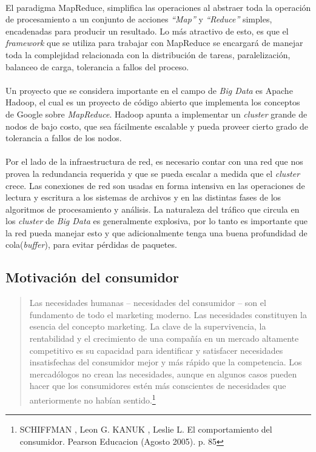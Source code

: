 \paragraph{}
El paradigma MapReduce, simplifica las operaciones al abstraer toda la operaci\'on de procesamiento a un conjunto de acciones \textit{“Map”} y \textit{“Reduce”} simples, encadenadas para producir un resultado. Lo m\'as atractivo de esto, es que el \textit{framework} que se utiliza para trabajar con MapReduce se encargar\'a de manejar toda la complejidad relacionada con la distribuci\'on de tareas, paralelizaci\'on, balanceo de carga, tolerancia a fallos del proceso.
\paragraph{}
Un proyecto que se considera importante en el campo de \textit{Big Data} es Apache Hadoop, el cual es un proyecto de c\'odigo abierto que implementa los conceptos de Google sobre \textit{MapReduce}. Hadoop apunta a implementar un \textit{cluster} grande de nodos de bajo costo, que sea f\'acilmente escalable y pueda proveer cierto grado de tolerancia a fallos de los nodos.
\paragraph{}
Por el lado de la infraestructura de red, es necesario contar con una red que nos provea la redundancia requerida y que se pueda escalar a medida que el \textit{cluster} crece. Las conexiones de red son usadas en forma intensiva en las operaciones de lectura y escritura a los sistemas de archivos y en las distintas fases de los algoritmos de procesamiento y an\'alisis. La naturaleza del tr\'afico que circula en los \textit{cluster} de \textit{Big Data} es generalmente explosiva, por lo tanto es importante que la red pueda manejar esto y que adicionalmente tenga una buena profundidad de cola(\textit{buffer}), para evitar p\'erdidas de paquetes.
\subsection{Motivaci\'on del consumidor}
\begin{quote}
Las necesidades humanas – necesidades del consumidor – son el fundamento de todo el marketing moderno. Las necesidades constituyen la esencia del concepto marketing. La clave de la supervivencia, la rentabilidad y el crecimiento de una compañ\'ia en un mercado altamente competitivo es su capacidad para identificar y satisfacer necesidades insatisfechas del consumidor mejor y m\'as r\'apido que la competencia.
Los mercad\'ologos no crean las necesidades, aunque en algunos casos pueden hacer que los consumidores est\'en m\'as conscientes de necesidades que anteriormente no hab\'ian sentido.\footnote{SCHIFFMAN , Leon G. KANUK , Leslie L. El comportamiento del consumidor. Pearson Educacion (Agosto 2005). p. 85}
\end{quote}
